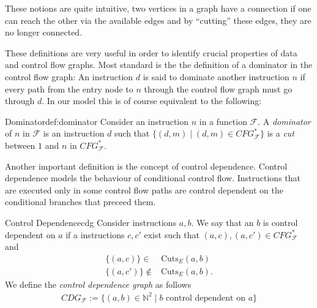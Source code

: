     These notions are quite intuitive, two vertices in a graph have a connection
    if one can reach the other via the available edges and by ``cutting'' these
    edges, they are no longer connected.

    These definitions are very useful in order to identify crucial properties of
    data and control flow graphs.
    Most standard is the the definition of a dominator in the control flow
    graph: An instruction $d$ is said to dominate another instruction $n$ if
    every path from the entry node to $n$ through the control flow graph must
    go through $d$.
    In our model this is of course equivalent to the following:

    \begin{definition}{Dominator}{def:dominator}
        Consider an instruction $n$ in a function $\mathcal F$.
        A {\em dominator} of $n$ in $\mathcal{F}$ is an instruction $d$ such
        that $\{(d,m)\mid(d,m)\in CFG_\mathcal{F}^*\}$ is a {\em cut} between $1$ and $n$ in $CFG_\mathcal{F}^*$.
    \end{definition}

    Another important definition is the concept of control dependence.
    Control dependence models the behaviour of conditional control flow.
    Instructions that are executed only in some control flow paths are control
    dependent on the conditional branches that preceed them.

    \begin{definition}{Control Dependence}{cdg}
        Consider instructions $a,b$.
        We say that an $b$ is control dependent on $a$ if a instructions
        $c,c'$ exist such that $(a,c),(a,c')\in CFG_\mathcal{F}^*$ and
        \begin{align*}
            \{(a,c)\}\in{}&{}\text{Cuts}_E(a,b)\\
            \{(a,c')\}\notin{}&{}\text{Cuts}_E(a,b)\text{.}
        \end{align*}
        We define the {\em control dependence graph} as follows
        \begin{align*}
            CDG_\mathcal{F}:=\{(a,b)\in\mathbb{N}^2\mid b\text{ control dependent on }a\}
        \end{align*}
    \end{definition}

